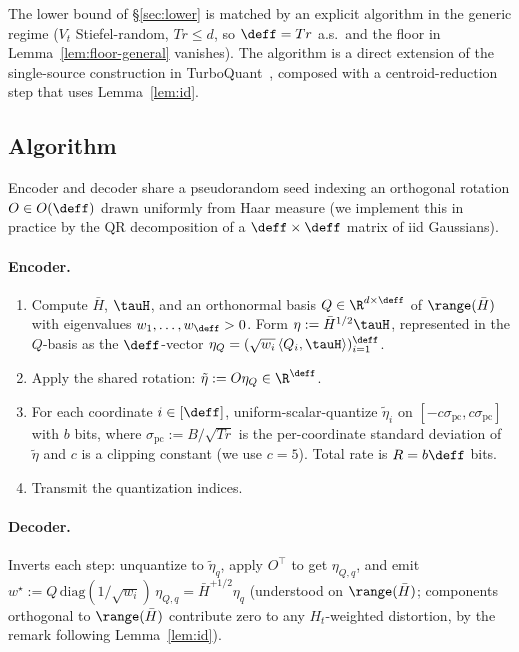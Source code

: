 The lower bound of \S\ref{sec:lower} is matched by an explicit
algorithm in the generic regime ($V_t$ Stiefel-random,
$Tr\leq d$, so $\deff = Tr$ a.s.\ and the floor in
Lemma~\ref{lem:floor-general} vanishes). The algorithm is a
direct extension of the single-source construction in
TurboQuant~\cite{zandieh2025turboquant}, composed with a
centroid-reduction step that uses Lemma~\ref{lem:id}.

\subsection{Algorithm}\label{subsec:alg}\label{subsec:rd-encoder-impl}

Encoder and decoder share a pseudorandom seed indexing an
orthogonal rotation $O\in O(\deff)$ drawn uniformly from Haar
measure (we implement this in practice by the QR decomposition
of a $\deff\times\deff$ matrix of iid Gaussians).

\paragraph{Encoder.}
\begin{enumerate}[leftmargin=*,topsep=2pt,itemsep=2pt]
  \item Compute $\bar H$, $\tauH$, and an orthonormal basis $Q
  \in\R^{d\times\deff}$ of $\range(\bar H)$ with eigenvalues
  $w_1,\ldots,w_\deff > 0$. Form
  $\eta := \bar H^{1/2}\tauH$, represented in the $Q$-basis as
  the $\deff$-vector $\eta_Q = (\sqrt{w_i}\,\langle Q_i,
  \tauH\rangle)_{i=1}^\deff$.
  \item Apply the shared rotation: $\tilde\eta := O\eta_Q\in
  \R^\deff$.
  \item For each coordinate $i\in[\deff]$, uniform-scalar-quantize
  $\tilde\eta_i$ on $[-c\sigma_{\mathrm{pc}}, c\sigma_{\mathrm{pc}}]$
  with $b$ bits, where $\sigma_{\mathrm{pc}} := B/\sqrt{Tr}$ is
  the per-coordinate standard deviation of $\tilde\eta$ and $c$
  is a clipping constant (we use $c = 5$). Total rate is
  $R = b\deff$ bits.
  \item Transmit the quantization indices.
\end{enumerate}

\paragraph{Decoder.} Inverts each step: unquantize to
$\tilde\eta_q$, apply $O^\top$ to get $\eta_{Q,q}$, and emit
$w^\star := Q\,\mathrm{diag}(1/\sqrt{w_i})\,\eta_{Q,q} =
\bar H^{+1/2}\eta_q$ (understood on $\range(\bar H)$; components
orthogonal to $\range(\bar H)$ contribute zero to any
$H_t$-weighted distortion, by the remark following
Lemma~\ref{lem:id}).

